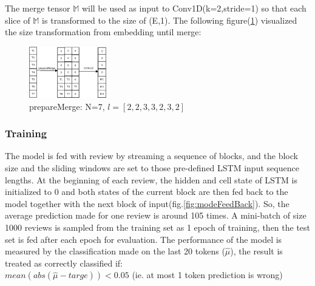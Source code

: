 \documentclass[12pt]{article}
\begin{document}
The merge tensor $\mathbb{M}$ will be used as input to Conv1D(k=2,stride=1) so that each slice of $\mathbb{M}$ is transformed to the size of (E,1). The following figure(\ref{fig:prepareMerge}) visualized the size transformation from embedding until merge:
\begin{figure} [!h]
\begin{center}
\includegraphics[width=0.3\textwidth]{figures/prepareMerge.png}
\caption{prepareMerge: N=7, $l=[2,2,3,3,2,3,2]$}
\label{fig:prepareMerge}
\end{center}
\end{figure}


\subsubsection{Training}
The model is fed with review by streaming a sequence of blocks, and the block size and the sliding windows are set to those pre-defined LSTM input sequence lengths. At the beginning of each review, the hidden and cell state of LSTM is initialized to 0 and both states of the current block are then fed back to the model together with the next block of input(fig.\ref{fig:modeFeedBack}). So, the average prediction made for one review is around 105 times. A mini-batch of size 1000 reviews is sampled from the training set as 1 epoch of training, then the test set is fed after each epoch for evaluation. The performance of the model is measured by the classification made on the last 20 tokens ($\hat{\mu}$), the result is treated as correctly classified if:\\
$mean(abs(\hat{\mu}-targe))<0.05$ (ie. at most 1 token prediction is wrong)
   
\end{document}
